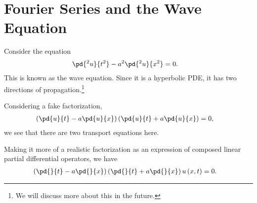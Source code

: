 \documentclass[10pt]{mypackage}
\begin{document}
\section{Fourier Series and the Wave Equation}%
\begin{example}
  Consider the equation
  \begin{align*}
    \pd{^2u}{t^2} - a^2 \pd{^2u}{x^2} &= 0.
  \end{align*}
  This is known as the wave equation. Since it is a hyperbolic PDE, it has two directions of propagation.\footnote{We will discuss more about this in the future.}\newline

  Considering a fake factorization,
  \begin{align*}
    \left( \pd{u}{t} - a\pd{u}{x} \right)\left( \pd{u}{t} + a\pd{u}{x} \right) &= 0,
  \end{align*}
  we see that there are two transport equations here.\newline

  Making it more of a realistic factorization as an expression of composed linear partial differential operators, we have
  \begin{align*}
    \left( \pd{}{t} - a\pd{}{x} \right) \left( \pd{}{t} + a \pd{}{x} \right) u\left( x,t \right) &= 0.
  \end{align*}
\end{example}
\end{document}
